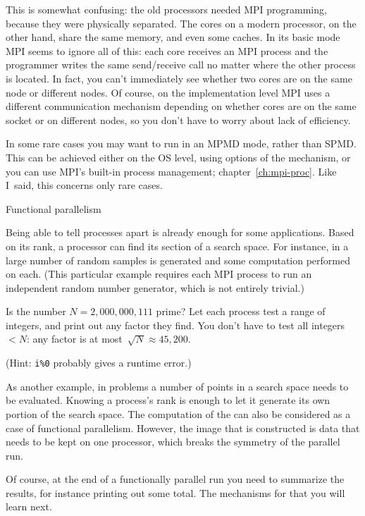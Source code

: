 This is somewhat confusing: the old processors needed MPI programming, because
they were physically separated. The cores on a modern processor, on the other hand,
share the same memory, and even some caches. In its basic mode MPI
seems to ignore all
of this: each core receives an MPI process and the programmer writes the same send/receive call no matter
where the other process is located. In fact, you can't immediately see
whether two cores are on the same node or different nodes. Of course,
on the implementation level MPI uses a different communication
mechanism depending on whether  cores are on the same socket or on
different nodes, so you don't have to worry about lack of efficiency.

\begin{remark}
  In some rare cases you may want to run in an \ac{MPMD} mode, rather
  than \ac{SPMD}. This can be achieved either on the \ac{OS} level,
  using options of the  mechanism, or you can use
  MPI's built-in process management; chapter~\ref{ch:mpi-proc}. Like
  I~said, this concerns only rare cases.
\end{remark}





 {Functional parallelism}

Being able to tell processes apart is already enough for some
applications.  Based on its rank, a processor can find its section of
a search space.  For instance, in  a
large number of random samples is generated and some computation
performed on each. (This particular example requires each MPI process
to run an independent random number generator, which is not entirely
trivial.)

\begin{exercise}
  \label{ex:primetest}
  Is the number $N=2,000,000,111$ prime?  Let each process test a
  range of integers, and print out any factor they find.  You don't
  have to test all integers~$<N$: any factor is at
  most~$\sqrt N\approx 45,200$.

  (Hint: \verb+i%0+ probably gives a runtime error.)
\end{exercise}

As another example, in  problems
a number of points in a search space needs to be evaluated. Knowing
a process's rank is enough to let it generate its own portion of the
search space. The computation of the  can
also be considered as a case of functional parallelism. However, the
image that is constructed is data that needs to be kept on one
processor, which breaks the symmetry of the parallel run.

Of course, at the end of a functionally parallel run you need to
summarize the results, for instance printing out some total.
The mechanisms for that you will learn next.

